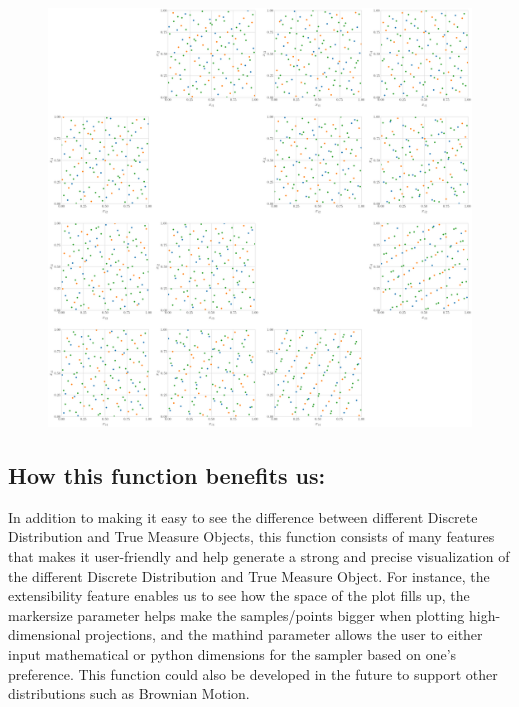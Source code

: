 \begin{enumerate}
\begin{figure}[H]
    \includegraphics[width = 0.99 \linewidth]{PlotProjectionsFunction/Figures/halton.png}
    \end{figure}
 \end{enumerate}
 \subsection*{How this function benefits us:}
 In addition to making it easy to see the difference between different Discrete Distribution and True Measure Objects, this function consists of many features that makes it user-friendly and help generate a strong and precise visualization of the different Discrete Distribution and True Measure Object. For instance, the extensibility feature enables us to see how the space of the plot fills up, the marker\textunderscore size parameter helps make the samples/points bigger when plotting high-dimensional projections, and the math\textunderscore ind parameter allows the user to either input mathematical or python dimensions for the sampler based on one's preference.  This function could also be developed in the future to support other distributions such as Brownian Motion.
